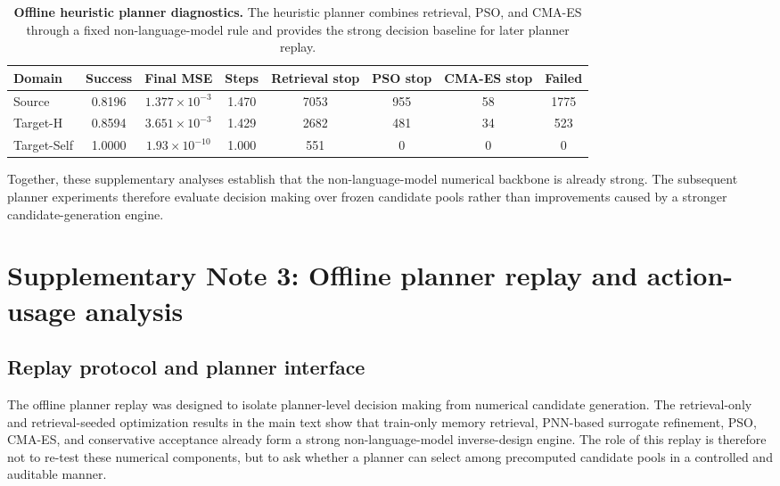 \documentclass[final,1p,times]{elsarticle}
\begin{document}
\begin{table}[htbp!]
\centering
\caption{\textbf{Offline heuristic planner diagnostics.}
The heuristic planner combines retrieval, PSO, and CMA-ES through a fixed non-language-model rule and provides the strong decision baseline for later planner replay.}
\label{tab:si_phase2_heuristic_planner}
\footnotesize
\setlength{\tabcolsep}{4.5pt}
\renewcommand{\arraystretch}{1.12}
\begin{tabular}{lccccccc}
\toprule
Domain & Success & Final MSE & Steps & Retrieval stop & PSO stop & CMA-ES stop & Failed \\
\midrule
Source & 0.8196 & $1.377\times10^{-3}$ & 1.470 & 7053 & 955 & 58 & 1775 \\
Target-H & 0.8594 & $3.651\times10^{-3}$ & 1.429 & 2682 & 481 & 34 & 523 \\
Target-Self & 1.0000 & $1.93\times10^{-10}$ & 1.000 & 551 & 0 & 0 & 0 \\
\bottomrule
\end{tabular}
\end{table}

Together, these supplementary analyses establish that the non-language-model numerical backbone is already strong. The subsequent planner experiments therefore evaluate decision making over frozen candidate pools rather than improvements caused by a stronger candidate-generation engine.





\section{Supplementary Note 3: Offline planner replay and action-usage analysis}

\subsection{Replay protocol and planner interface}

The offline planner replay was designed to isolate planner-level decision making from numerical candidate generation. The retrieval-only and retrieval-seeded optimization results in the main text show that train-only memory retrieval, PNN-based surrogate refinement, PSO, CMA-ES, and conservative acceptance already form a strong non-language-model inverse-design engine. The role of this replay is therefore not to re-test these numerical components, but to ask whether a planner can select among precomputed candidate pools in a controlled and auditable manner.
\end{document}
